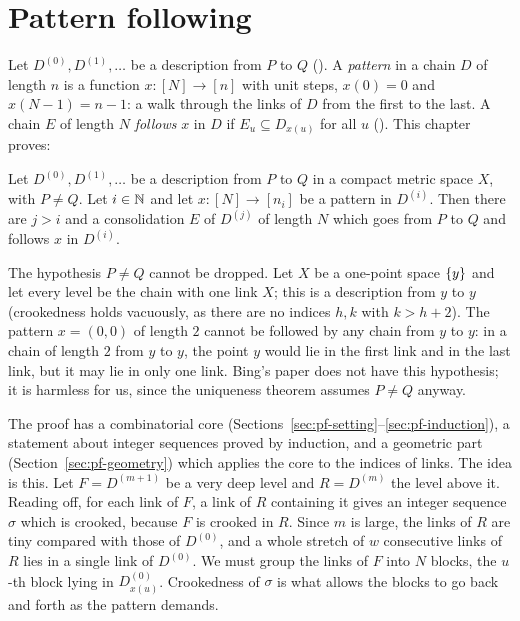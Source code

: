 \chapter{Pattern following}\label{ch:patterns}

Let $D^{(0)},D^{(1)},\dots$ be a description from $P$ to $Q$ (). A
\emph{pattern} in a chain $D$ of length $n$ is a function $x\colon[N]\to[n]$ with unit steps,
$x(0)=0$ and $x(N-1)=n-1$: a walk through the links of $D$ from the first to the last. A chain $E$ of
length $N$ \emph{follows} $x$ in $D$ if $E_u\subseteq D_{x(u)}$ for all $u$ ().
This chapter proves:

\begin{theorem}\label{thm:pattern-following}
Let $D^{(0)},D^{(1)},\dots$ be a description from $P$ to $Q$ in a compact metric space $X$, with
$P\neq Q$. Let $i\in\mathbb{N}$ and let $x\colon[N]\to[n_i]$ be a pattern in $D^{(i)}$. Then there are $j>i$
and a consolidation $E$ of $D^{(j)}$ of length $N$ which goes from $P$ to $Q$ and follows $x$ in $D^{(i)}$.
\end{theorem}


\begin{remark}\label{rem:pf-false}
The hypothesis $P\neq Q$ cannot be dropped. Let $X$ be a one-point space $\left\{ y \right\}$ and let every level be
the chain with one link $X$; this is a description from $y$ to $y$ (crookedness holds vacuously, as
there are no indices $h,k$ with $k>h+2$). The pattern $x=(0,0)$ of length $2$ cannot be followed by any
chain from $y$ to $y$: in a chain of length $2$ from $y$ to $y$, the point $y$ would lie in the first link
and in the last link, but it may lie in only one link. Bing's paper does not have this hypothesis; it is
harmless for us, since the uniqueness theorem assumes $P\neq Q$ anyway.
\end{remark}


The proof has a combinatorial core (Sections~\ref{sec:pf-setting}--\ref{sec:pf-induction}), a statement
about integer sequences proved by induction, and a geometric part (Section~\ref{sec:pf-geometry}) which
applies the core to the indices of links. The idea is this. Let $F=D^{(m+1)}$ be a very deep level and
$R=D^{(m)}$ the level above it. Reading off, for each link of $F$, a link of $R$ containing it gives an
integer sequence $\sigma$ which is crooked, because $F$ is crooked in $R$. Since $m$ is large, the links of
$R$ are tiny compared with those of $D^{(0)}$, and a whole stretch of $w$ consecutive links of $R$ lies in a
single link of $D^{(0)}$. We must group the links of $F$ into $N$ blocks, the $u$-th block lying in
$D^{(0)}_{x(u)}$. Crookedness of $\sigma$ is what allows the blocks to go back and forth as the pattern
demands.


